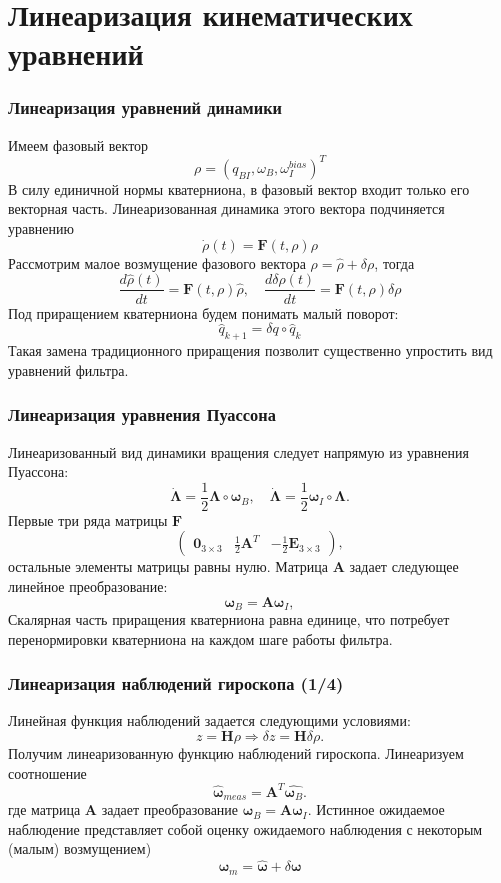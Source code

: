 \documentclass[utf8]{beamer}
\begin{document}
\section{Линеаризация кинематических уравнений}
\begin{frame}
\frametitle{Линеаризация уравнений динамики}
Имеем фазовый вектор
$$
\rho = \left(q_{BI}, \omega_B, \omega_I^{bias}\right)^T
$$
В силу единичной нормы кватерниона, в фазовый вектор входит только его
векторная часть. Линеаризованная динамика этого вектора подчиняется уравнению
$$
\dot{\rho}\left(t\right) = \mathbf{F}\left(t, \rho\right)\rho
$$
Рассмотрим малое возмущение фазового вектора $\rho = \hat{\rho} + \delta\rho$,
тогда
$$
\frac{d\hat{\rho}\left(t\right)}{dt} = \mathbf{F}\left(t, \rho\right)\hat{\rho},\quad
\frac{d\delta{\rho}\left(t\right)}{dt} = \mathbf{F}\left(t, \rho\right)\delta{\rho}
$$
Под приращением кватерниона будем понимать малый поворот:
$$
\hat{q}_{k+1} = \delta q \circ \hat{q}_{k}
$$
Такая замена традиционного приращения позволит существенно упростить вид
уравнений фильтра.
\end{frame}
\begin{frame}
\frametitle{Линеаризация уравнения Пуассона}
Линеаризованный вид динамики вращения следует напрямую из уравнения Пуассона:
$$
\dot{\mathbf{\Lambda}} =
\frac{1}{2}\mathbf{\Lambda}\circ\mathbf{\omega}_B,\quad
\dot{\mathbf{\Lambda}} = \frac{1}{2}\mathbf{\omega}_I\circ\mathbf{\Lambda}.
$$
Первые три ряда матрицы $\mathbf{F}$
$$
\left(\begin{array}{ccc}
        \mathbf{0}_{3\times 3} & \frac{1}{2}\mathbf{A}^T &
        -\frac{1}{2}\mathbf{E}_{3\times 3}
\end{array}\right),
$$
остальные элементы матрицы равны нулю.  Матрица $\mathbf{A}$ задает следующее
линейное  преобразование:
$$
\mathbf{\omega}_B = \mathbf{A}\mathbf{\omega}_I, 
$$
Скалярная часть приращения кватерниона равна единице, что потребует
перенормировки кватерниона на каждом шаге работы фильтра.
\end{frame}
\begin{frame}
    \frametitle{Линеаризация наблюдений гироскопа (1/4)}
Линейная функция наблюдений задается следующими условиями:
$$
z = \mathbf{H}\rho \Rightarrow \delta z = \mathbf{H}\delta\rho.
$$
Получим линеаризованную функцию наблюдений гироскопа. Линеаризуем соотношение
$$
\hat{\mathbf{\omega}}_{meas} = \mathbf{A}^T\hat{\mathbf{\omega}_B}.
$$
где матрица $ \mathbf{A}$ задает преобразование $\mathbf{\omega}_B =
\mathbf{A}\mathbf{\omega}_I$. Истинное ожидаемое наблюдение представляет собой
оценку ожидаемого наблюдения с некоторым (малым) возмущением)
$$
\mathbf{\omega}_m = \hat{\mathbf{\omega}} + \delta\mathbf{\omega}
$$
\end{frame}
\end{document}
